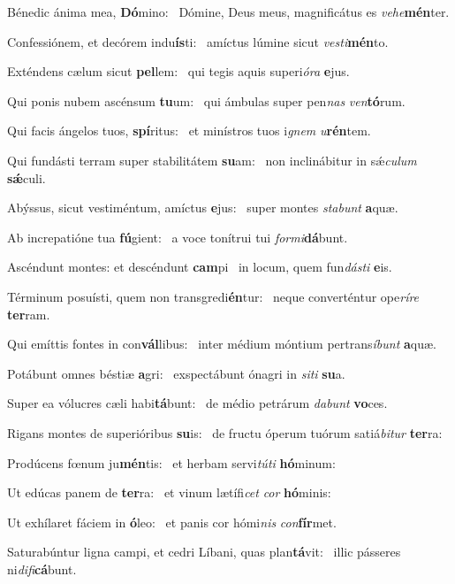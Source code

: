 \item Bénedic ánima mea, \textbf{Dó}mino:~\psstar{} Dómine, Deus meus, magnificátus es \textit{vehe}\textbf{mén}ter.
\item Confessiónem, et decórem indu\textbf{ís}ti:~\psstar{} amíctus lúmine sicut \textit{vesti}\textbf{mén}to.
\item Exténdens cælum sicut \textbf{pel}lem:~\psstar{} qui tegis aquis superi\textit{óra} \textbf{e}jus.
\item Qui ponis nubem ascénsum \textbf{tu}um:~\psstar{} qui ámbulas super pen\textit{nas} \textit{ven}\textbf{tó}rum.
\item Qui facis ángelos tuos, \textbf{spí}ritus:~\psstar{} et minístros tuos i\textit{gnem} \textit{u}\textbf{rén}tem.
\item Qui fundásti terram super stabilitátem \textbf{su}am:~\psstar{} non inclinábitur in sǽ\textit{culum} \textbf{sǽ}culi.
\item Abýssus, sicut vestiméntum, amíctus \textbf{e}jus:~\psstar{} super montes \textit{stabunt} \textbf{a}quæ.
\item Ab increpatióne tua \textbf{fú}gient:~\psstar{} a voce tonítrui tui \textit{formi}\textbf{dá}bunt.
\item Ascéndunt montes: et descéndunt \textbf{cam}pi~\psstar{} in locum, quem fun\textit{dásti} \textbf{e}is.
\item Términum posuísti, quem non transgredi\textbf{én}tur:~\psstar{} neque converténtur ope\textit{ríre} \textbf{ter}ram.
\item Qui emíttis fontes in con\textbf{vál}libus:~\psstar{} inter médium móntium pertrans\textit{íbunt} \textbf{a}quæ.
\item Potábunt omnes béstiæ \textbf{a}gri:~\psstar{} exspectábunt ónagri in \textit{siti} \textbf{su}a.
\item Super ea vólucres cæli habi\textbf{tá}bunt:~\psstar{} de médio petrárum \textit{dabunt} \textbf{vo}ces.
\item Rigans montes de superióribus \textbf{su}is:~\psstar{} de fructu óperum tuórum satiá\textit{bitur} \textbf{ter}ra:
\item Prodúcens fœnum ju\textbf{mén}tis:~\psstar{} et herbam servi\textit{túti} \textbf{hó}minum:
\item Ut edúcas panem de \textbf{ter}ra:~\psstar{} et vinum lætífi\textit{cet} \textit{cor} \textbf{hó}minis:
\item Ut exhílaret fáciem in \textbf{ó}leo:~\psstar{} et panis cor hómi\textit{nis} \textit{con}\textbf{fír}met.
\item Saturabúntur ligna campi, et cedri Líbani, quas plan\textbf{tá}vit:~\psstar{} illic pásseres ni\textit{difi}\textbf{cá}bunt.
